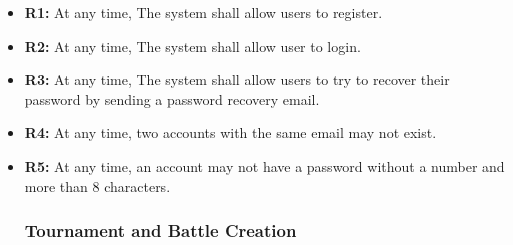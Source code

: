 \documentclass{article}
\begin{document}
\begin{itemize}
    \item \textbf{R1:} At any time, The system shall allow users to register.
    \item \textbf{R2:} At any time, The system shall allow user to login. 
    \item \textbf{R3:} At any time, The system shall allow users to try to recover their password by sending a password recovery email.
    \item \textbf{R4:} At any time, two accounts with the same email may not exist.
    \item \textbf{R5:} At any time, an account may not have a password without a number and more than 8 characters.

    \subsubsection*{Tournament and Battle Creation}


\end{itemize}
\end{document}
